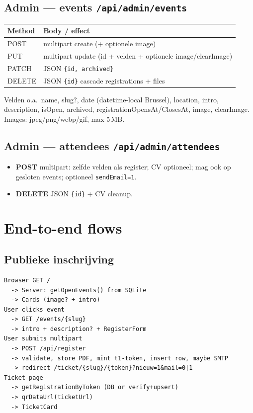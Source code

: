 \documentclass[11pt,a4paper]{report}
\begin{document}
\section{Admin --- events \texttt{/api/admin/events}}
\begin{tabularx}{\textwidth}{@{}lX@{}}
\toprule
\textbf{Method} & \textbf{Body / effect} \\
\midrule
POST & multipart create (+ optionele image) \\
PUT & multipart update (id + velden + optionele image/clearImage) \\
PATCH & JSON \texttt{\{id, archived\}} \\
DELETE & JSON \texttt{\{id\}} cascade registrations + files \\
\bottomrule
\end{tabularx}
Velden o.a.\ name, slug?, date (datetime-local Brussel), location, intro, description,
isOpen, archived, registrationOpensAt/ClosesAt, image, clearImage.
Images: jpeg/png/webp/gif, max 5\,MB.

\section{Admin --- attendees \texttt{/api/admin/attendees}}
\begin{itemize}[leftmargin=*]
  \item \textbf{POST} multipart: zelfde velden als register; CV optioneel;
        mag ook op gesloten events; optioneel \texttt{sendEmail=1}.
  \item \textbf{DELETE} JSON \texttt{\{id\}} + CV cleanup.
\end{itemize}

\chapter{End-to-end flows}

\section{Publieke inschrijving}
\begin{lstlisting}
Browser GET /
  -> Server: getOpenEvents() from SQLite
  -> Cards (image? + intro)
User clicks event
  -> GET /events/{slug}
  -> intro + description? + RegisterForm
User submits multipart
  -> POST /api/register
  -> validate, store PDF, mint t1-token, insert row, maybe SMTP
  -> redirect /ticket/{slug}/{token}?nieuw=1&mail=0|1
Ticket page
  -> getRegistrationByToken (DB or verify+upsert)
  -> qrDataUrl(ticketUrl)
  -> TicketCard
\end{lstlisting}
\end{document}
